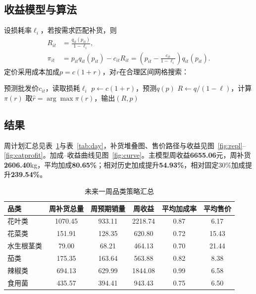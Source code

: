\documentclass[UTF8,a4paper,12pt]{ctexart}
\begin{document}
\subsection{收益模型与算法}
设损耗率$\ell_i$，若按需求匹配补货，则
\begin{align}
R_{it}&=\frac{q_{it}(p_{it})}{1-\ell_i},\\
\pi_{it}&=p_{it}q_{it}(p_{it})-c_{it}R_{it}
=\left(p_{it}-\frac{c_{it}}{1-\ell_i}\right)q_{it}(p_{it}).
\end{align}
定价采用成本加成$p=c(1+r)$，对$r$在合理区间网格搜索：

\begin{algorithm}[H]
\caption{品类日度加成率优化}
\begin{algorithmic}[1]
\State 预测批发价$c_{it}$，读取损耗$\ell_i$
\State $p\leftarrow c(1+r)$，预测$q(p)$
\State $R\leftarrow q/(1-\ell)$，计算$\pi(r)$
\EndFor
\State 取$\hat r=\arg\max \pi(r)$，输出$(R,p)$
\EndFor
\end{algorithmic}
\end{algorithm}

\subsection{结果}
周计划汇总见表~\ref{tab:q2}与表~\ref{tab:day}，补货堆叠图、售价路径与收益见图~\ref{fig:repl}--\ref{fig:catprofit}。加成--收益曲线见图~\ref{fig:curve}。主模型周收益\textbf{6655.06}元，周补货\textbf{2606.40}kg，平均加成\textbf{80.65\%}；相对历史加成提升\textbf{54.93\%}，相对固定30\%加成提升\textbf{239.54\%}。

\begin{table}[H]
\centering
\caption{未来一周品类策略汇总}
\label{tab:q2}
\scriptsize
\begin{tabular}{lccccc}
\toprule
品类 & 周补货总量 & 周预期销量 & 周收益 & 平均加成率 & 平均售价 \\
\hline
花叶类 & 1070.45 & 933.11 & 2218.74 & 0.87 & 6.17 \\
花菜类 & 151.91 & 128.35 & 620.80 & 0.72 & 15.43 \\
水生根茎类 & 79.00 & 68.21 & 464.13 & 0.70 & 21.44 \\
茄类 & 175.35 & 163.64 & 563.88 & 0.82 & 8.38 \\
辣椒类 & 694.13 & 629.99 & 1844.08 & 0.99 & 6.58 \\
食用菌 & 435.57 & 394.41 & 943.43 & 0.75 & 6.50 \\
\bottomrule
\end{tabular}
\end{table}
\end{document}
